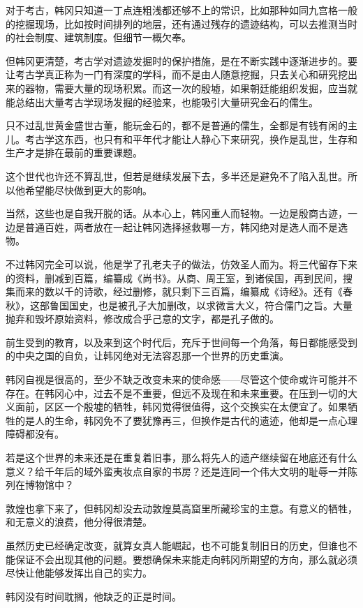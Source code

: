 对于考古，韩冈只知道一丁点连粗浅都还够不上的常识，比如那种如同九宫格一般的挖掘现场，比如按时间排列的地层，还有通过残存的遗迹结构，可以去推测当时的社会制度、建筑制度。但细节一概欠奉。

但韩冈更清楚，考古学对遗迹发掘时的保护措施，是在不断实践中逐渐进步的。要让考古学真正称为一门有深度的学科，而不是由人随意挖掘，只去关心和研究挖出来的器物，需要大量的现场积累。而这一次的殷墟，如果朝廷能组织发掘，应当就能总结出大量考古学现场发掘的经验来，也能吸引大量研究金石的儒生。

只不过乱世黄金盛世古董，能玩金石的，都不是普通的儒生，全都是有钱有闲的主儿。考古学这东西，也只有和平年代才能让人静心下来研究，换作是乱世，生存和生产才是排在最前的重要课题。

这个世代也许还不算乱世，但若是继续发展下去，多半还是避免不了陷入乱世。所以他希望能尽快做到更大的影响。

当然，这些也是自我开脱的话。从本心上，韩冈重人而轻物。一边是殷商古迹，一边是普通百姓，两者放在一起让韩冈选择拯救哪一方，韩冈绝对是选人而不是选物。

不过韩冈完全可以说，他是学了孔老夫子的做法，仿效圣人而为。将三代留存下来的资料，删减到百篇，编纂成《尚书》。从商、周王室，到诸侯国，再到民间，搜集而来的数以千的诗歌，经过删修，就只剩下三百篇，编纂成《诗经》。还有《春秋》，这部鲁国国史，也是被孔子大加删改，以求微言大义，符合儒门之旨。大量抛弃和毁坏原始资料，修改成合乎己意的文字，都是孔子做的。

前生受到的教育，以及来到这个时代后，充斥于世间每一个角落，每日都能感受到的中央之国的自负，让韩冈绝对无法容忍那一个世界的历史重演。

韩冈自视是很高的，至少不缺乏改变未来的使命感——尽管这个使命或许可能并不存在。在韩冈心中，过去不是不重要，但远不及现在和未来重要。在压到一切的大义面前，区区一个殷墟的牺牲，韩冈觉得很值得，这个交换实在太便宜了。如果牺牲的是人的生命，韩冈免不了要犹豫再三，但换作是古代的遗迹，他却是一点心理障碍都没有。

若是这个世界的未来还是在重复着旧事，那么将先人的遗产继续留在地底还有什么意义？给千年后的域外蛮夷妆点自家的书房？还是连同一个伟大文明的耻辱一并陈列在博物馆中？

敦煌也拿下来了，但韩冈却没去动敦煌莫高窟里所藏珍宝的主意。有意义的牺牲，和无意义的浪费，他分得很清楚。

虽然历史已经确定改变，就算女真人能崛起，也不可能复制旧日的历史，但谁也不能保证不会出现其他的问题。要想确保未来能走向韩冈所期望的方向，那么就必须尽快让他能够发挥出自己的实力。

韩冈没有时间耽搁，他缺乏的正是时间。


